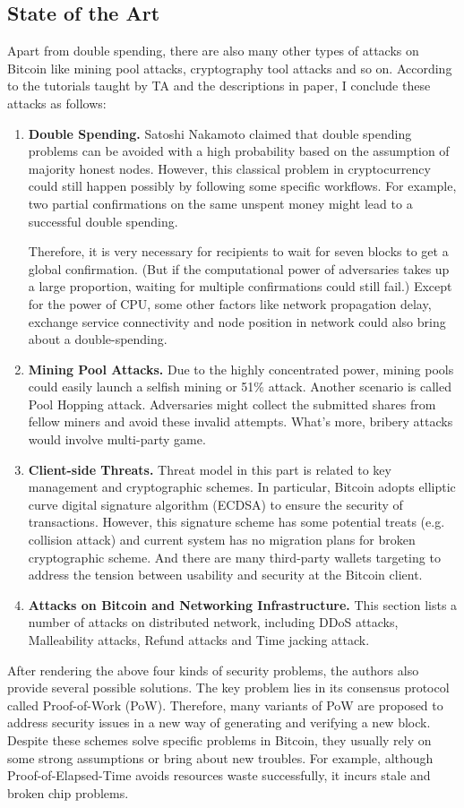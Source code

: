 \documentclass[conference]{IEEEtran}
\begin{document}
\subsection{State of the Art}
Apart from double spending, there are also many other types of attacks on Bitcoin like mining pool attacks, cryptography tool attacks and so on.
%
According to the tutorials taught by TA and the descriptions in paper, I conclude these attacks as follows:
%
\begin{enumerate}[label=(\roman*)]
   \item  \textbf{Double Spending.} Satoshi Nakamoto claimed that double spending problems can be avoided with a high probability \cite{nakamoto2008bitcoin} based on the assumption of majority honest nodes.
   However, this classical problem in cryptocurrency could still happen possibly by following some specific workflows.
   For example, two partial confirmations on the same unspent money might lead to a successful double spending. 
   
   Therefore, it is very necessary for recipients to wait for seven blocks to get a global confirmation.
   (But if the computational power of adversaries takes up a large proportion, waiting for multiple confirmations could still fail.)
   Except for the power of CPU, some other factors like network propagation delay, exchange service connectivity and node position in network could also bring about a double-spending.
   \item  \textbf{Mining Pool Attacks.} Due to the highly concentrated power, mining pools could easily launch a selfish mining or 51$\%$ attack.
   Another scenario is called Pool Hopping attack. Adversaries might collect the submitted shares from fellow miners and avoid these invalid attempts.
   What's more, bribery attacks would involve multi-party game.
   \item \textbf{Client-side Threats.} Threat model in this part is related to key management and cryptographic  schemes.
   In particular, Bitcoin adopts elliptic curve digital signature algorithm (ECDSA) to ensure the security of transactions.
   However, this signature scheme has some potential treats (e.g. collision attack) and current system has no migration plans for broken cryptographic scheme.
   And there are many third-party wallets targeting to address the tension between usability and security at the Bitcoin client.  
   \item \textbf{Attacks on Bitcoin and Networking Infrastructure.} 
   This section lists a number of attacks on distributed network, including DDoS attacks, Malleability attacks, Refund attacks and Time jacking attack.
\end{enumerate}
%
After rendering the above four kinds of security problems, the authors also provide several possible solutions. 
%
The key problem lies in its consensus protocol called Proof-of-Work (PoW). 
%
Therefore, many variants of PoW are proposed to address security issues in a new way of generating and verifying a new block.
%
Despite these schemes solve specific problems in Bitcoin, they usually rely on some strong assumptions or bring about new troubles.
%
For example, although Proof-of-Elapsed-Time avoids resources waste successfully, it incurs stale and broken chip problems.
\end{document}
